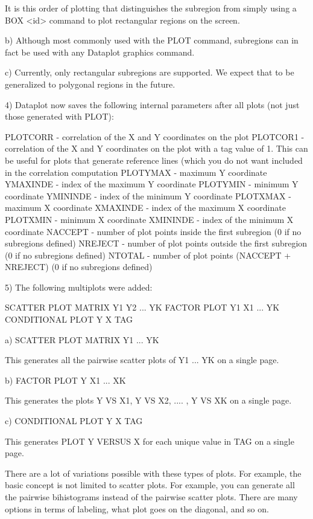 {       It is this order of plotting that distinguishes the
       subregion from simply using a BOX <id> command to plot
       rectangular regions on the screen.

    b) Although most commonly used with the PLOT command, subregions
       can in fact be used with any Dataplot graphics command.

    c) Currently, only rectangular subregions are supported.
       We expect that to be generalized to polygonal regions
       in the future.

 4) Dataplot now saves the following internal parameters after
    all plots (not just those generated with PLOT):

    PLOTCORR - correlation of the X and Y coordinates on the plot
    PLOTCOR1 - correlation of the X and Y coordinates on the plot
               with a tag value of 1.  This can be useful for
               plots that generate reference lines (which you
               do not want included in the correlation computation
    PLOTYMAX - maximum Y coordinate
    YMAXINDE - index of the maximum Y coordinate
    PLOTYMIN - minimum Y coordinate
    YMININDE - index of the minimum Y coordinate
    PLOTXMAX - maximum X coordinate
    XMAXINDE - index of the maximum X coordinate
    PLOTXMIN - minimum X coordinate
    XMININDE - index of the minimum X coordinate
    NACCEPT  - number of plot points inside the first subregion
               (0 if no subregions defined)
    NREJECT  - number of plot points outside the first subregion
               (0 if no subregions defined)
    NTOTAL   - number of plot points (NACCEPT + NREJECT)
               (0 if no subregions defined)

 5) The following multiplots were added:

    SCATTER PLOT MATRIX  Y1 Y2 ... YK
    FACTOR PLOT Y1 X1 ... YK
    CONDITIONAL PLOT Y X TAG

    a) SCATTER PLOT MATRIX Y1 ... YK

       This generates all the pairwise scatter plots of Y1 ... YK
       on a single page.

    b) FACTOR PLOT Y X1 ... XK
 
       This generates the plots Y VS X1, Y VS X2, .... , Y VS XK
       on a single page.

    c) CONDITIONAL PLOT Y X TAG

       This generates PLOT Y VERSUS X for each unique value in
       TAG on a single page.

    There are a lot of variations possible with these types of
    plots.  For example, the basic concept is not limited to
    scatter plots.  For example, you can generate all the pairwise
    bihistograms instead of the pairwise scatter plots.  There are
    many options in terms of labeling, what plot goes on the
    diagonal, and so on.

}
